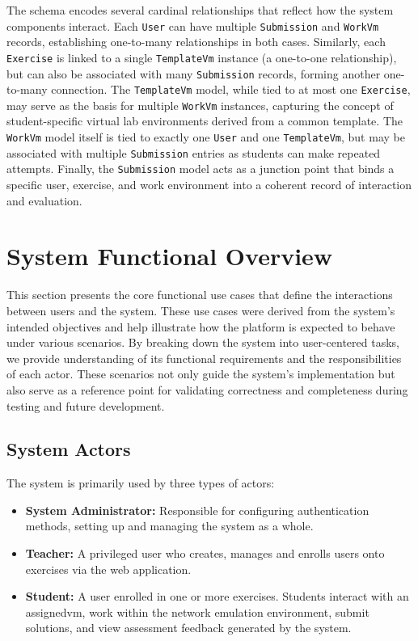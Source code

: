         The schema encodes several cardinal relationships that reflect how the system components interact. Each \texttt{User} can have multiple 
        \texttt{Submission} and \texttt{WorkVm} records, establishing one-to-many relationships in both cases. Similarly, each \texttt{Exercise} 
        is linked to a single \texttt{TemplateVm} instance (a one-to-one relationship), but can also be associated with many \texttt{Submission} 
        records, forming another one-to-many connection. The \texttt{TemplateVm} model, while tied to at most one \texttt{Exercise}, may serve 
        as the basis for multiple \texttt{WorkVm} instances, capturing the concept of student-specific virtual lab environments derived from a 
        common template. The \texttt{WorkVm} model itself is tied to exactly one \texttt{User} and one \texttt{TemplateVm}, but may be associated 
        with multiple \texttt{Submission} entries as students can make repeated attempts. Finally, the \texttt{Submission} model acts as a junction 
        point that binds a specific user, exercise, and work environment into a coherent record of interaction and evaluation.


\section{System Functional Overview}

    This section presents the core functional use cases that define the interactions between users and the system. These use cases were derived 
    from the system's intended objectives and help illustrate how the platform is expected to behave under various scenarios. By breaking down the 
    system into user-centered tasks, we provide understanding of its functional requirements and the responsibilities of each actor. These scenarios 
    not only guide the system's implementation but also serve as a reference point for validating correctness and completeness during testing and 
    future development.

    \subsection{System Actors}

        The system is primarily used by three types of actors:

        \begin{itemize}
            \item \textbf{System Administrator:} Responsible for configuring authentication methods, setting up and managing the system as a whole.

            \item \textbf{Teacher:} A privileged user who creates, manages and enrolls users onto exercises via the web application. 

            \item \textbf{Student:} A user enrolled in one or more exercises. Students interact with an assigned\ac{vm}, work within the network 
            emulation environment, submit solutions, and view assessment feedback generated by the system.
        \end{itemize}

